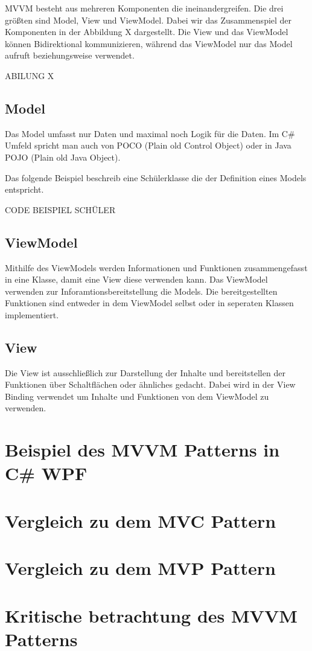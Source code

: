 \documentclass[titlepage=false,12pt]{scrreprt}
\begin{document}
	MVVM besteht aus mehreren Komponenten die ineinandergreifen. Die drei 
	größten sind Model, View und ViewModel. Dabei wir das Zusammenspiel 
	der Komponenten in der Abbildung X dargestellt. Die View und das ViewModel 
	können Bidirektional kommunizieren, während das ViewModel nur das Model
	aufruft beziehungsweise verwendet.

	ABILUNG X

	\section{Model}

	Das Model umfasst nur Daten und maximal noch Logik für die Daten. 
	Im C\# Umfeld spricht man auch von POCO (Plain old Control Object) 
	oder in Java POJO (Plain old Java Object).
	
	Das folgende Beispiel beschreib eine Schülerklasse die der Definition 
	eines Models entspricht.

	CODE BEISPIEL SCHÜLER

	\section{ViewModel}

	Mithilfe des ViewModels werden Informationen und Funktionen zusammengefasst
	in eine Klasse, damit eine View diese verwenden kann. Das ViewModel verwenden zur 
	Inforamtionsbereitstellung die Models. Die bereitgestellten Funktionen sind
	entweder in dem ViewModel selbst oder in seperaten Klassen implementiert.

	\section{View}

	Die View ist ausschließlich zur Darstellung der Inhalte und bereitstellen der
	Funktionen über Schaltflächen oder ähnliches gedacht. Dabei wird in der View
	Binding verwendet um Inhalte und Funktionen von dem ViewModel zu verwenden. 

	\chapter{Beispiel des MVVM Patterns in C\# WPF}


	\chapter{Vergleich zu dem MVC Pattern}


	\chapter{Vergleich zu dem MVP Pattern}


	\chapter{Kritische betrachtung des MVVM Patterns}
\end{document}
